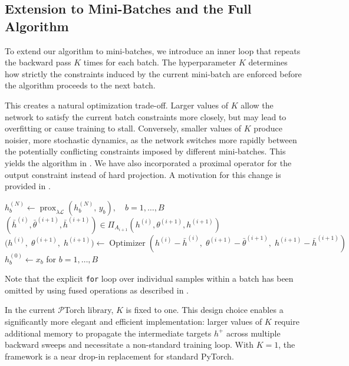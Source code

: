 \documentclass{article}
\let\cref\crtcref
\begin{document}
\subsection{Extension to Mini-Batches and the Full Algorithm}
To extend our algorithm to mini-batches, we introduce an inner loop that repeats the backward pass $K$ times for each batch. The hyperparameter $K$ determines how strictly the constraints induced by the current mini-batch are enforced before the algorithm proceeds to the next batch.

This creates a natural optimization trade-off. Larger values of $K$ allow the network to satisfy the current batch constraints more closely, but may lead to overfitting or cause training to stall. Conversely, smaller values of $K$ produce noisier, more stochastic dynamics, as the network switches more rapidly between the potentially conflicting constraints imposed by different mini-batches. This yields the algorithm in \cref{alg:minibatch}. We have also incorporated a proximal operator for the output constraint instead of hard projection. A motivation for this change is provided in \cref{sec:moreau}.

\begin{algorithm}[htbp] \label{alg:minibatch}
\caption{Mini-Batch $\mathcal{P}$Torch}
\begin{algorithmic}[1]
\State $h^{(N)}_b \gets \operatorname{prox}_{\lambda \mathcal{L}}\!\left(h^{(N)}_b,\, y_b\right), \quad b=1,\ldots,B$
 
     
        \State $(\bar h^{(i)}, \bar \theta^{(i+1)}, \bar h^{(i+1)}) \in \Pi_{A_{i+1}}(h^{(i)}, \theta^{(i+1)}, h^{(i+1)})$ 
        \State $\bigl(h^{(i)},\;\theta^{(i+1)},\;h^{(i+1)}\bigr) \gets \operatorname{Optimizer}\!\left( h^{(i)} - \bar{h}^{(i)},\; \theta^{(i+1)} - \bar\theta^{(i+1)},\; h^{(i+1)} - \bar{h}^{(i+1)}  \right)$
    \EndFor
\EndFor
\State $h^{(0)}_b \gets x_b$ for $b=1,\ldots,B$
\end{algorithmic}
\end{algorithm}

Note that the explicit \texttt{for} loop over individual samples within a batch has been omitted by using fused operations as described in \cref{subsec:fused}.

In the current $\mathcal{P}$Torch library, $K$ is fixed to one. This design choice enables a significantly more elegant
and efficient implementation: larger values of $K$ require additional memory to propagate the
intermediate targets $h^+$ across multiple backward sweeps and necessitate a non-standard training
loop. With $K=1$, the framework is a near drop-in replacement for standard PyTorch.
\end{document}

